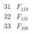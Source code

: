 \documentclass{article}
\begin{document}
{$$\begin{array}{|r|*{7}{r|}}
\\
\hline
31 
 &  F_{119}&
 & 
 & 
 & 
 & 
 & 
\\
\hline
32 
 &  F_{131}&
 & 
 & 
 & 
 & 
 & 
\\
\hline
33 
 &  F_{108}&
 & 
 & 
 & 

\end{array}$$}
\end{document}
